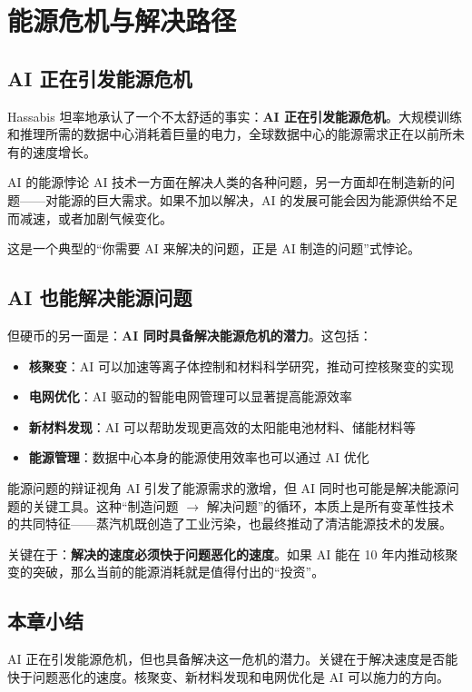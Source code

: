 \section{能源危机与解决路径}

\subsection{AI 正在引发能源危机}

Hassabis 坦率地承认了一个不太舒适的事实：\textbf{AI 正在引发能源危机}。大规模训练和推理所需的数据中心消耗着巨量的电力，全球数据中心的能源需求正在以前所未有的速度增长。

\begin{warningbox}{AI 的能源悖论}
AI 技术一方面在解决人类的各种问题，另一方面却在制造新的问题——对能源的巨大需求。如果不加以解决，AI 的发展可能会因为能源供给不足而减速，或者加剧气候变化。

这是一个典型的``你需要 AI 来解决的问题，正是 AI 制造的问题''式悖论。
\end{warningbox}

\subsection{AI 也能解决能源问题}

但硬币的另一面是：\textbf{AI 同时具备解决能源危机的潜力}。这包括：

\begin{itemize}
    \item \textbf{核聚变}：AI 可以加速等离子体控制和材料科学研究，推动可控核聚变的实现
    \item \textbf{电网优化}：AI 驱动的智能电网管理可以显著提高能源效率
    \item \textbf{新材料发现}：AI 可以帮助发现更高效的太阳能电池材料、储能材料等
    \item \textbf{能源管理}：数据中心本身的能源使用效率也可以通过 AI 优化
\end{itemize}

\begin{importantbox}{能源问题的辩证视角}
AI 引发了能源需求的激增，但 AI 同时也可能是解决能源问题的关键工具。这种``制造问题 $\to$ 解决问题''的循环，本质上是所有变革性技术的共同特征——蒸汽机既创造了工业污染，也最终推动了清洁能源技术的发展。

关键在于：\textbf{解决的速度必须快于问题恶化的速度}。如果 AI 能在 10 年内推动核聚变的突破，那么当前的能源消耗就是值得付出的``投资''。
\end{importantbox}

\subsection{本章小结}

AI 正在引发能源危机，但也具备解决这一危机的潜力。关键在于解决速度是否能快于问题恶化的速度。核聚变、新材料发现和电网优化是 AI 可以施力的方向。


